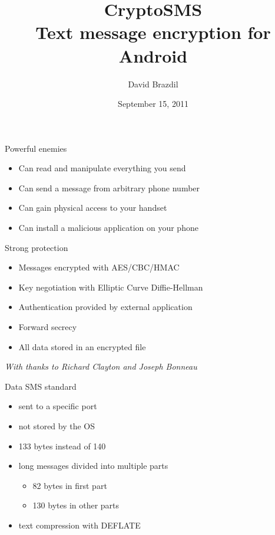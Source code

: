\documentclass{beamer}
\title[CryptoSMS]{CryptoSMS\\Text message encryption for Android}
\author{David Brazdil}
\institute{University of Cambridge}
\date{September 15, 2011}
\begin{document}
%

\begin{frame}
	\titlepage
\end{frame}


\begin{frame}{Powerful enemies}
	\begin{itemize}
		\item{Can read and manipulate everything you send}
		\item{Can send a message from arbitrary phone number}
		\item{Can gain physical access to your handset}
		\item{Can install a malicious application on your phone}
	\end{itemize}
\end{frame}

\begin{frame}{Strong protection}
	\vfill
	\begin{itemize}
		\item{Messages encrypted with AES/CBC/HMAC}
		\item{Key negotiation with Elliptic Curve Diffie-Hellman}
		\item{Authentication provided by external application}
		\item{Forward secrecy}
		\item{All data stored in an encrypted file}
	\end{itemize}
	\vfill
	\begin{flushright}
	\emph{With thanks to Richard Clayton and Joseph Bonneau}
	\end{flushright}
\end{frame}



\begin{frame}{Data SMS standard}
	\begin{itemize}
		\item{sent to a specific port}
		\item{not stored by the OS}
		\item{133 bytes instead of 140}
		\item{long messages divided into multiple parts}
		\begin{itemize}
			\item{82 bytes in first part}
			\item{130 bytes in other parts}
		\end{itemize}
		\item{text compression with DEFLATE}
	\end{itemize}
\end{frame}
\end{document}
